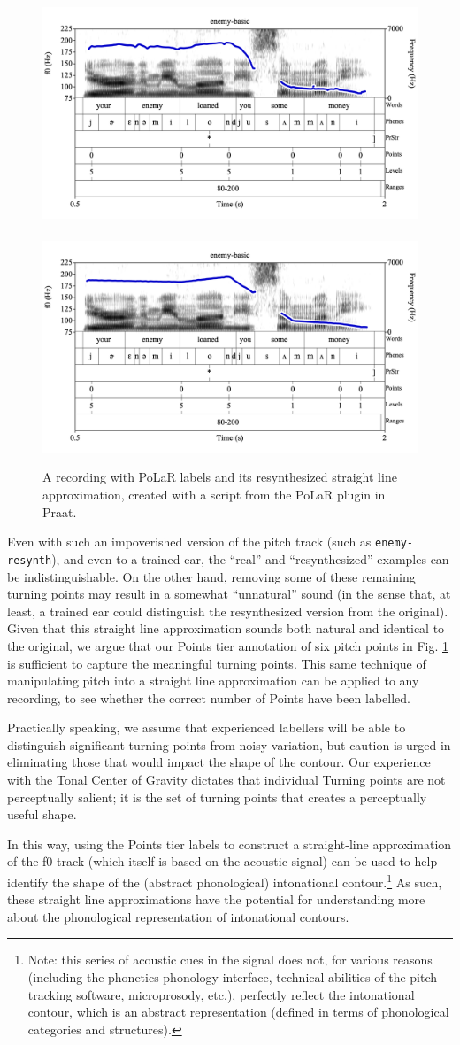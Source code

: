 \documentclass[11pt, twoside]{memoir}
\begin{document}
\begin{figure}[H]
\centering
%
\includegraphics[width=.485\linewidth]{Contours-enemy.png}~~\includegraphics[width=.485\linewidth]{Contours-enemy-resynth.png}
%
\caption{A recording with PoLaR labels and its resynthesized straight line approximation, created with a script from the PoLaR plugin in Praat.%
\label{fig:enemy original and resynth}%
}
\end{figure}

Even with such an impoverished version of the pitch track (such as \texttt{enemy-resynth}), and even to a trained ear, the “real” and “resynthesized” examples can be indistinguishable. On the other hand, removing some of these remaining turning points may result in a somewhat “unnatural” sound (in the sense that, at least, a trained ear could distinguish the resynthesized version from the original). Given that this straight line approximation sounds both natural and identical to the original, we argue that our Points tier annotation of six pitch points in Fig. \ref{fig:enemy original and resynth} is sufficient to capture the meaningful turning points. This same technique of manipulating pitch into a straight line approximation can be applied to any recording, to see whether the correct number of Points have been labelled.

Practically speaking, we assume that experienced labellers will be able to distinguish significant turning points from noisy variation, but caution is urged in eliminating those that would impact the shape of the contour. Our experience with the Tonal Center of Gravity dictates that individual Turning points are not perceptually salient; it is the set of turning points that creates a perceptually useful shape. 

In this way, using the Points tier labels to construct a straight-line approximation of the f0 track (which itself is based on the acoustic signal) can be used to help identify the shape of the (abstract phonological) intonational contour.\footnote{Note: this series of acoustic cues in the signal does not, for various reasons (including the phonetics-phonology interface, technical abilities of the pitch tracking software, microprosody, etc.), perfectly reflect the intonational contour, which is an abstract representation (defined in terms of phonological categories and structures).} As such, these straight line approximations have the potential for understanding more about the phonological representation of intonational contours.
\end{document}
